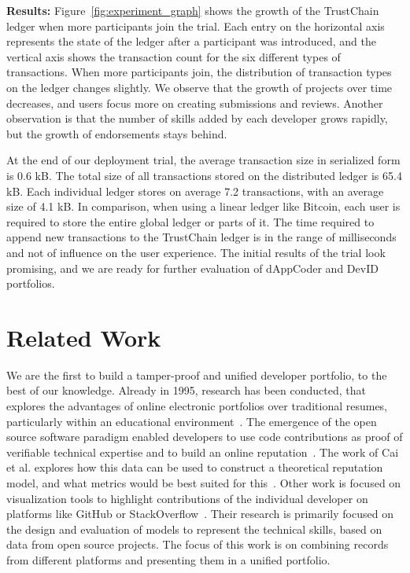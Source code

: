 \textbf{Results:}
Figure~\ref{fig:experiment_graph} shows the growth of the TrustChain ledger when more participants join the trial.
Each entry on the horizontal axis represents the state of the ledger after a participant was introduced, and the vertical axis shows the transaction count for the six different types of transactions.
When more participants join, the distribution of transaction types on the ledger changes slightly.
We observe that the growth of projects over time decreases, and users focus more on creating submissions and reviews.
Another observation is that the number of skills added by each developer grows rapidly, but the growth of endorsements stays behind.

At the end of our deployment trial, the average transaction size in serialized form is 0.6 kB.
The total size of all transactions stored on the distributed ledger is 65.4 kB.
Each individual ledger stores on average 7.2 transactions, with an average size of 4.1 kB.
In comparison, when using a linear ledger like Bitcoin, each user is required to store the entire global ledger or parts of it.  
The time required to append new transactions to the TrustChain ledger is in the range of milliseconds and not of influence on the user experience.
The initial results of the trial look promising, and we are ready for further evaluation of dAppCoder and DevID portfolios. 

\section{Related Work}
We are the first to build a tamper-proof and unified developer portfolio, to the best of our knowledge.
Already in 1995, research has been conducted, that explores the advantages of online electronic portfolios over traditional resumes, particularly within an educational environment~\cite{riggsby1995electronic,barrett2000electronic}.
The emergence of the open source software paradigm enabled developers to use code contributions as proof of verifiable technical expertise and to build an online reputation~\cite{riehle2015open}.
The work of Cai et al. explores how this data can be used to construct a theoretical reputation model, and what metrics would be best suited for this~\cite{cai2016reputation}.
Other work is focused on visualization tools to highlight contributions of the individual developer on platforms like GitHub or StackOverflow~\cite{jaruchotrattanasakul2016open,saxena2017know,chen2016supporting}.
Their research is primarily focused on the design and evaluation of models to represent the technical skills, based on data from open source projects.
The focus of this work is on combining records from different platforms and presenting them in a unified portfolio.

